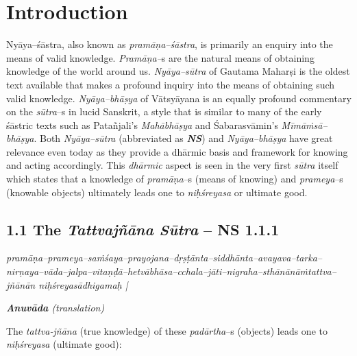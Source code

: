 
\chapter{Introduction}\label{chapter1}

Nyāya–śāstra, also known as \textit{pramāṇa–śāstra}, is primarily an enquiry into the means of valid knowledge. \textit{Pramāṇa–}s are the natural means of obtaining knowledge of the world around us. \textit{Nyāya–sūtra} of Gautama Maharṣi  is the oldest text available that makes a profound inquiry into the means of obtaining such valid knowledge. \textit{Nyāya–bhāṣya} of Vātsyāyana is an equally profound commentary on the \textit{sūtra}–s in lucid Sanskrit, a style that is similar to many of the early śāstric texts such as Patañjali’s \textit{Mahābhāṣya} and Śabarasvāmin’s \textit{Mīmāṁsā–bhāṣya}. Both \textit{Nyāya–sūtra }(abbreviated as \textit{\textbf{NS}}) and \textit{Nyāya–bhāṣya} have great relevance even today as they provide a dhārmic basis and framework for knowing and acting accordingly. This \textit{dhārmic} aspect is seen in the very first \textit{sūtra} itself which states that a knowledge of \textit{pramāṇa}–s (means of knowing) and \textit{prameya}–s (knowable objects) ultimately leads one to \textit{niḥśreyasa} or ultimate good.

\section*{1.1 The {\it {\bfseries Tattvajñāna Sūtra}} – NS 1.1.1}

\begin{myquote}
\textit{pramāṇa–prameya–saṁśaya–prayojana–dṛṣṭānta–siddhānta–avayava–tarka–\break nirṇaya–vāda–jalpa–vitaṇḍā–hetvābhāsa–cchala–jāti–nigraha–sthānānāṁ\break tattva–jñānān niḥśreyasādhigamaḥ |}
\end{myquote}

\textit{\textbf{Anuvāda} (translation)}

The \textit{tattva-jñāna} (true knowledge) of these \textit{padārtha}–s (objects) leads one to \textit{niḥśreyasa} (ultimate good): 

